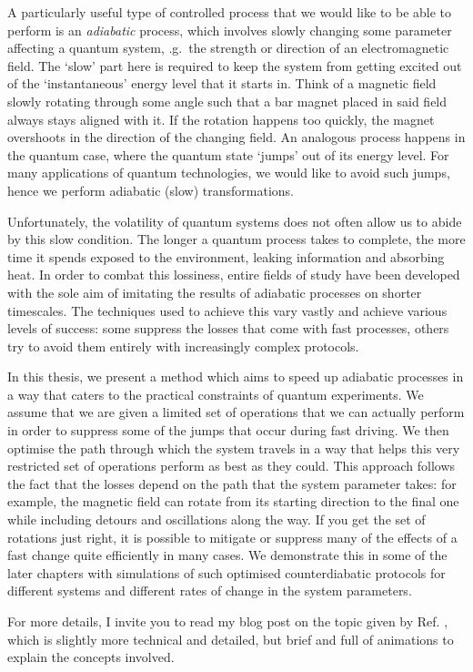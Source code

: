 A particularly useful type of controlled process that we would like to be able to perform is an \emph{adiabatic} process, which involves slowly changing some parameter affecting a quantum system, \@e.g.~the strength or direction of an electromagnetic field. The `slow' part here is required to keep the system from getting excited out of the `instantaneous' energy level that it starts in. Think of a magnetic field slowly rotating through some angle such that a bar magnet placed in said field always stays aligned with it. If the rotation happens too quickly, the magnet overshoots in the direction of the changing field. An analogous process happens in the quantum case, where the quantum state `jumps' out of its energy level. For many applications of quantum technologies, we would like to avoid such jumps, hence we perform adiabatic (slow) transformations.

Unfortunately, the volatility of quantum systems does not often allow us to abide by this slow condition. The longer a quantum process takes to complete, the more time it spends exposed to the environment, leaking information and absorbing heat. In order to combat this lossiness, entire fields of study have been developed with the sole aim of imitating the results of adiabatic processes on shorter timescales. The techniques used to achieve this vary vastly and achieve various levels of success: some suppress the losses that come with fast processes, others try to avoid them entirely with increasingly complex protocols.

In this thesis, we present a method which aims to speed up adiabatic processes in a way that caters to the practical constraints of quantum experiments. We assume that we are given a limited set of operations that we can actually perform in order to suppress some of the jumps that occur during fast driving. We then optimise the path through which the system travels in a way that helps this very restricted set of operations perform as best as they could. This approach follows the fact that the losses depend on the path that the system parameter takes: for example, the magnetic field can rotate from its starting direction to the final one while including detours and oscillations along the way. If you get the set of rotations just right, it is possible to mitigate or suppress many of the effects of a fast change quite efficiently in many cases. We demonstrate this in some of the later chapters with simulations of such optimised counterdiabatic protocols for different systems and different rates of change in the system parameters. 

For more details, I invite you to read my blog post on the topic given by Ref. \cite{cepaite_cold_2023}, which is slightly more technical and detailed, but brief and full of animations to explain the concepts involved. 
